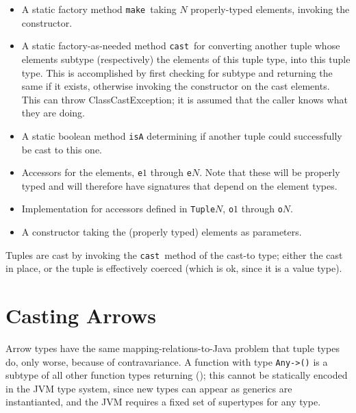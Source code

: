 \documentclass[11pt]{article}
\begin{document}
\begin{itemize}
\begin{itemize}

  \item A static factory method \verb+make+\ taking $N$ properly-typed elements, invoking the constructor.

  \item A static factory-as-needed method \verb+cast+\ for converting another tuple whose elements subtype (respectively) the elements of this tuple type, into this tuple type.  This is accomplished by first checking for subtype and returning the same if it exists, otherwise invoking the constructor on the cast elements.  This can throw ClassCastException; it is assumed that the caller knows what they are doing.

  \item A static boolean method \verb+isA+ determining if another tuple could successfully be cast to this one.

  \item Accessors for the elements, \verb+e+$1$ through \verb+e+$N$.  Note that these will be properly typed and will therefore have signatures that depend on the element types.

  \item Implementation for accessors defined in \verb+Tuple+$N$, \verb+o+$1$ through \verb+o+$N$.

  \item A constructor taking the (properly typed) elements as parameters.
  \end{itemize}

\end{itemize}

Tuples are cast by invoking the \verb+cast+\ method of the cast-to type; either the cast in place, or the tuple is effectively coerced (which is ok, since it is a value type).

\section{Casting Arrows}

Arrow types have the same mapping-relations-to-Java problem that tuple types do, only worse, because of contravariance.  A function with type \verb+Any->()+ is a subtype of all other function types returning (); this cannot be statically encoded in the JVM type system, since new types can appear as generics are instantianted, and the JVM requires a fixed set of supertypes for any type.
\end{document}
